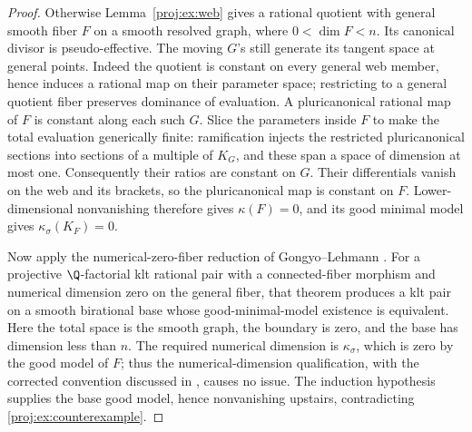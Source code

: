 \begin{proof}
Otherwise Lemma~\ref{proj:ex:web} gives a rational quotient with general
smooth fiber \(F\) on a smooth resolved graph, where
\(0<\dim F<n\). Its canonical divisor is pseudo-effective.
The moving \(G\)'s still generate its tangent space at general
points. Indeed the quotient is constant on every general web
member, hence induces a rational map on their parameter space;
restricting to a general quotient fiber preserves dominance of
evaluation. A pluricanonical rational map of \(F\) is constant
along each such \(G\). Slice the parameters inside \(F\) to make
the total evaluation generically finite: ramification injects the
restricted pluricanonical sections into sections of a multiple of
\(K_G\), and these span a space of dimension at most one.
Consequently their ratios are constant on \(G\). Their
differentials vanish on the web and its brackets, so the
pluricanonical map is constant on \(F\). Lower-dimensional
nonvanishing therefore gives \(\kappa(F)=0\), and its good minimal
model gives \(\kappa_\sigma(K_F)=0\).

Now apply the numerical-zero-fiber reduction of
Gongyo--Lehmann \cite[Theorem~1.3 and Corollary~4.5]{Proj-GongyoLehmann2013}.
For a projective \(\Q\)-factorial klt rational pair with a
connected-fiber morphism and numerical dimension zero on the
general fiber, that theorem produces a klt pair on a smooth
birational base whose good-minimal-model existence is equivalent.
Here the total space is the smooth graph, the boundary is zero,
and the base has dimension less than \(n\). The required numerical
dimension is \(\kappa_\sigma\), which is zero by the good model of
\(F\); thus the numerical-dimension qualification, with the
corrected convention discussed in
\cite[Section~3 and Theorem~3.2]{Proj-Fujino2019Numerical},
causes no issue. The induction hypothesis supplies the base good
model, hence nonvanishing upstairs, contradicting
\eqref{proj:ex:counterexample}.
\end{proof}

